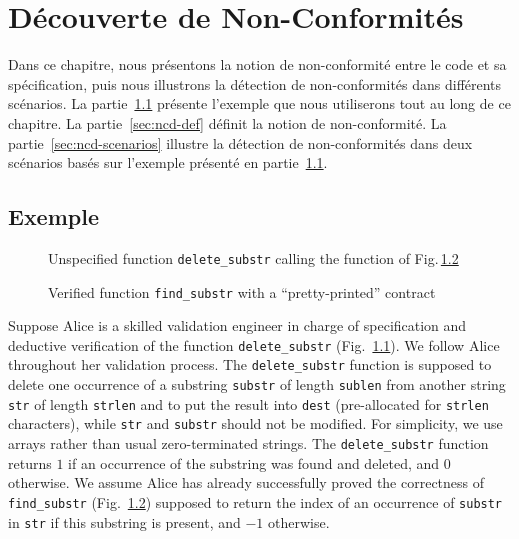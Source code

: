 
\chapter{Découverte de Non-Conformités}
\label{sec:ncd}

\chapterintro

Dans ce chapitre, nous présentons la notion de non-conformité entre le code et
sa spécification, puis nous illustrons la détection de non-conformités dans
différents scénarios.
La partie~\ref{sec:ncd-ex} présente l'exemple que nous utiliserons tout au long
de ce chapitre.
La partie~\ref{sec:ncd-def} définit la notion de non-conformité.
La partie~\ref{sec:ncd-scenarios} illustre la détection
de non-conformités dans deux scénarios basés sur l'exemple présenté en
partie~\ref{sec:ncd-ex}.


\section{Exemple}
\label{sec:ncd-ex}


\begin{figure}[t]
  
  \vspace{-3mm}
  \caption{Unspecified function \lstinline{delete_substr} calling the function
    of Fig.\,\ref{fig:findSubstr}}
  \vspace{-3mm}
  \label{fig:deleteSubstrTrous}
\end{figure}

\begin{figure}[t]
  
  \vspace{-3mm}
  \caption{Verified function \lstinline{find_substr} with a ``pretty-printed''
    \eacsl contract}
  \vspace{-3mm}
  \label{fig:findSubstr}
\end{figure}

Suppose Alice is a skilled validation engineer in charge of specification 
and deductive verification of the function \lstinline{delete_substr} 
(Fig.~\ref{fig:deleteSubstrTrous}).
We follow Alice throughout her validation process.
The \lstinline{delete_substr}  function is supposed to delete one occurrence of
a substring \lstinline{substr} of length \lstinline{sublen} from another string
\lstinline{str} of length \lstinline{strlen}
and to put the result into \lstinline{dest} (pre-allocated 
for \lstinline{strlen} characters), while \lstinline{str} and \lstinline{substr}
should not be modified.
For simplicity, we use arrays rather than 
usual zero-terminated strings.
The \lstinline{delete_substr}  function returns $1$ if an occurrence of
the substring was found and deleted, and $0$ otherwise.
We assume Alice has already successfully proved the correctness of 
\lstinline{find_substr}  (Fig.~\ref{fig:findSubstr})
supposed to  return the index of an occurrence of \lstinline{substr}
in \lstinline{str} if this substring is present, and $-1$ otherwise. 

